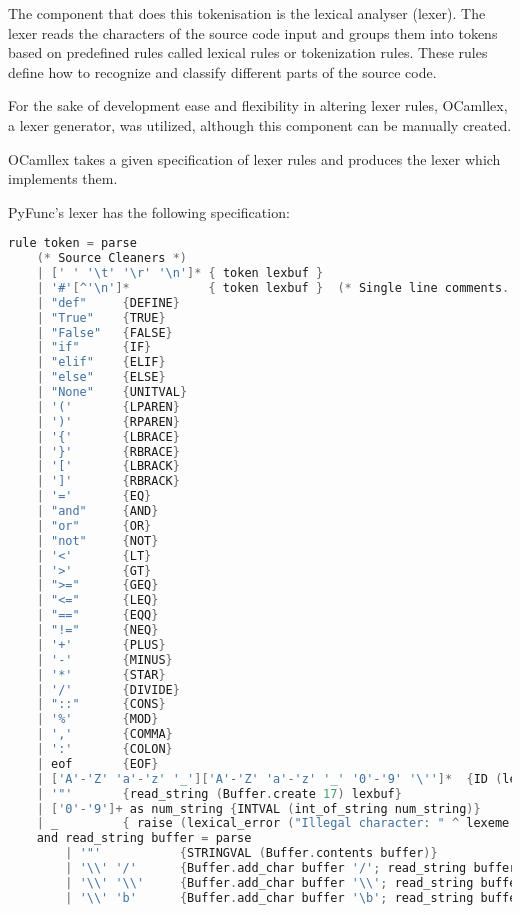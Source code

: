 \documentclass{l4proj}
\begin{document}
The component that does this tokenisation is the lexical analyser (lexer).
The lexer reads the characters of the source code input and groups them into tokens based on predefined rules called lexical rules or tokenization rules.
These rules define how to recognize and classify different parts of the source code.

For the sake of development ease and flexibility in altering lexer rules, OCamllex, a lexer generator, was utilized, although this component can be manually created.

OCamllex takes a given specification of lexer rules and produces the lexer which implements them.

PyFunc's lexer has the following specification:

\begin{lstlisting}[language=C, caption=PyFunc's lexer specification for OCamllex., keepspaces=true]
rule token = parse
    (* Source Cleaners *)
    | [' ' '\t' '\r' '\n']* { token lexbuf }
    | '#'[^'\n']*           { token lexbuf }  (* Single line comments. *)
    | "def"     {DEFINE}
    | "True"    {TRUE}
    | "False"   {FALSE}
    | "if"      {IF}
    | "elif"    {ELIF}
    | "else"    {ELSE}
    | "None"    {UNITVAL}
    | '('       {LPAREN}
    | ')'       {RPAREN}
    | '{'       {LBRACE}
    | '}'       {RBRACE}
    | '['       {LBRACK}
    | ']'       {RBRACK}
    | '='       {EQ}
    | "and"     {AND}
    | "or"      {OR}
    | "not"     {NOT}
    | '<'       {LT}
    | '>'       {GT}
    | ">="      {GEQ}
    | "<="      {LEQ}
    | "=="      {EQQ}
    | "!="      {NEQ}
    | '+'       {PLUS}
    | '-'       {MINUS}
    | '*'       {STAR}
    | '/'       {DIVIDE}
    | "::"      {CONS}
    | '%'       {MOD}
    | ','       {COMMA}
    | ':'       {COLON}
    | eof       {EOF}
    | ['A'-'Z' 'a'-'z' '_']['A'-'Z' 'a'-'z' '_' '0'-'9' '\'']*  {ID (lexeme lexbuf)}
    | '"'       {read_string (Buffer.create 17) lexbuf}
    | ['0'-'9']+ as num_string {INTVAL (int_of_string num_string)}
    | _         { raise (lexical_error ("Illegal character: " ^ lexeme lexbuf))}
    and read_string buffer = parse
        | '"'           {STRINGVAL (Buffer.contents buffer)}
        | '\\' '/'      {Buffer.add_char buffer '/'; read_string buffer lexbuf}
        | '\\' '\\'     {Buffer.add_char buffer '\\'; read_string buffer lexbuf}
        | '\\' 'b'      {Buffer.add_char buffer '\b'; read_string buffer lexbuf}

\end{lstlisting}
\end{document}
